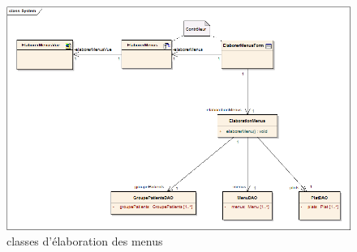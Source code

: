 \begin{figure}
  \centering
      \includegraphics[width=1.00\textwidth]{../../CasDUtilisations/MenuGen/Classes/EMC.png} %
\caption{classes d'élaboration des menus}
\label{ClassesMenuGen}
\end{figure}
